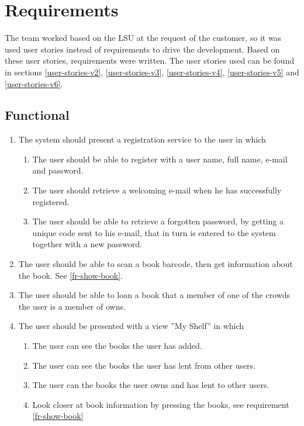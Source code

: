 \chapter{Requirements}
\label{requirements}

The team worked based on the \gls{LSU} at the request of the customer, so it was used user stories instead of requirements to drive the development. Based on these user stories, requirements were written. The user stories used can be found in sections \ref{user-stories-v2}, \ref{user-stories-v3}, \ref{user-stories-v4}, \ref{user-stories-v5} and \ref{user-stories-v6}.


\section{Functional}
\begin{enumerate}[label= {\bf FR \arabic*}]
    \item The system should present a registration service to the user in which 
        \begin{enumerate}
            \item The user should be able to register with a user name, full name, e-mail and password. 
            \item The user should retrieve a welcoming e-mail when he has successfully registered.
            \item The user should be able to retrieve a forgotten password, by getting a unique code sent to his e-mail, that in turn is entered to the system together with a new password.
        \end{enumerate}
    \item The user should be able to scan a book barcode, then get information about the book. See \ref{fr-show-book}.
    
    \item The user should be able to loan a book that a member of one of the crowds the user is a member of owns. \label{fr-user-loan-book}
    
    \item The user should be presented with a view ''My Shelf'' in which
        \begin{enumerate}
            \item The user can see the books the user has added.
            \item The user can see the books the user has lent from other users.
            \item The user can the books the user owns and has lent to other users.
            \item Look closer at book information by pressing the books, see requirement \ref{fr-show-book}
        \end{enumerate}
        

\end{enumerate}
